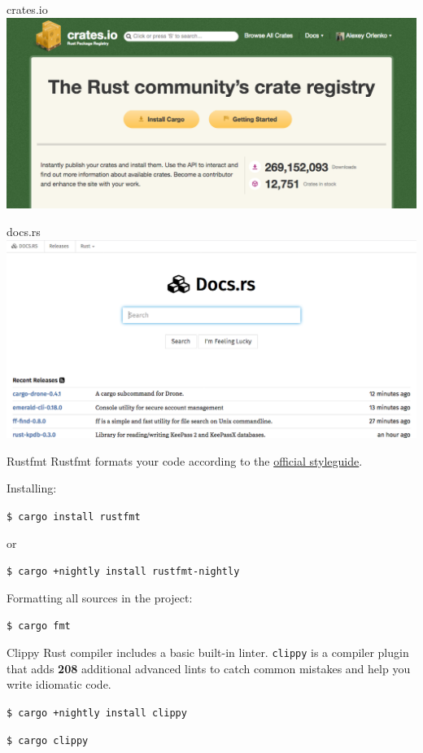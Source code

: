 \documentclass[12pt, aspectratio=169]{beamer}
\begin{document}
\begin{frame}{crates.io}
  \includegraphics[width=\textwidth]{images/crates-io.png}
\end{frame}

\begin{frame}{docs.rs}
  \includegraphics[width=\textwidth]{images/docs-rs.png}
\end{frame}

\begin{frame}{Rustfmt}
  Rustfmt formats your code according to the
  \href{https://github.com/rust-lang-nursery/fmt-rfcs}{official styleguide}.

  Installing:

  \texttt{\$ cargo install rustfmt}

  or

  \texttt{\$ cargo +nightly install rustfmt-nightly}

  Formatting all sources in the project:

  \texttt{\$ cargo fmt}
\end{frame}

\begin{frame}{Clippy}
  Rust compiler includes a basic built-in linter. \texttt{clippy} is a compiler
  plugin that adds \textbf{208} additional advanced lints to catch common
  mistakes and help you write idiomatic code.

  \texttt{\$ cargo +nightly install clippy}

  \texttt{\$ cargo clippy}
\end{frame}
\end{document}
